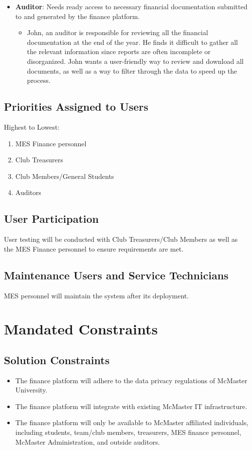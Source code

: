\documentclass[12pt]{article}
\begin{document}
\begin{itemize}
    \item \textbf{Auditor}: Needs ready access to necessary financial documentation submitted to and generated by the finance platform.
    \begin{itemize}
        \item John, an auditor is responsible for reviewing all the financial documentation at the end of the year. He finds it difficult to gather all the relevant information since reports are often incomplete or disorganized. John wants a user-friendly way to review and download all documents, as well as a way to filter through the data to speed up the process.
    \end{itemize}
\end{itemize}

\subsection{Priorities Assigned to Users}
Highest to Lowest:
\begin{enumerate}
    \item MES Finance personnel
    \item Club Treasurers
    \item Club Members/General Students
    \item Auditors
\end{enumerate}

\subsection{User Participation}
User testing will be conducted with Club Treasurers/Club Members as well as the MES Finance personnel to ensure requirements are met.

\subsection{Maintenance Users and Service Technicians}
MES personnel will maintain the system after its deployment.


\section{Mandated Constraints}
\subsection{Solution Constraints}
\begin{itemize}
    \item The finance platform will adhere to the data privacy regulations of McMaster University.
    \item The finance platform will integrate with existing McMaster IT infrastructure.
    \item The finance platform will only be available to McMaster affiliated individuals, including students, team/club members, treasurers, MES finance personnel, McMaster Administration, and outside auditors.
\end{itemize}
\end{document}
